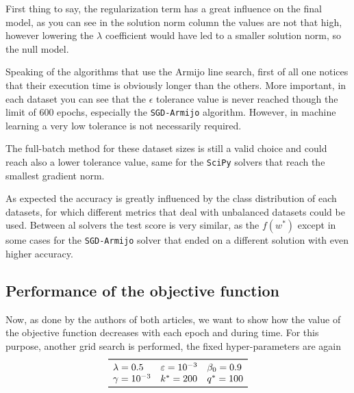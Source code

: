
First thing to say, the regularization term has a great influence on the final model, as you can see in the solution norm column the values are not that high, however lowering the $\lambda$ coefficient would have led to a smaller solution norm, so the null model.

Speaking of the algorithms that use the Armijo line search, first of all one notices that their execution time is obviously longer than the others. More important, in each dataset you can see that the $\epsilon$ tolerance value is never reached though the limit of 600 epochs, especially the \texttt{SGD-Armijo} algorithm. However, in machine learning a very low tolerance is not necessarily required.

The full-batch method for these dataset sizes is still a valid choice and could reach also a lower tolerance value, same for the \texttt{SciPy} solvers that reach the smallest gradient norm.

As expected the accuracy is greatly influenced by the class distribution of each datasets, for which different metrics that deal with unbalanced datasets could be used. Between al solvers the test score is very similar, as the $f(w^\ast)$ except in some cases for the \texttt{SGD-Armijo} solver that ended on a different solution with even higher accuracy.

\subsection{Performance of the objective function}

Now, as done by the authors of both articles, we want to show how the value of the objective function decreases with each epoch and during time. For this purpose, another grid search is performed, the fixed hyper-parameters are again
\[
\begin{array}{lll}
\toprule
\lambda=0.5 & \epsilon=\num{e-3} & \beta_0=0.9 \\
\gamma=\num{e-3} & k^\ast=200 & q^\ast=100 \\
\bottomrule
\end{array}
\]

